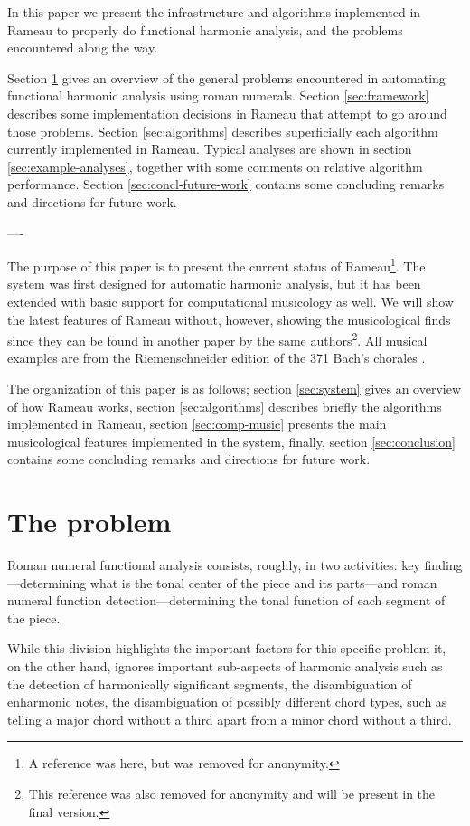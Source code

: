 In this paper we present the infrastructure and algorithms implemented
in Rameau to properly do functional harmonic analysis, and the
problems encountered along the way.

Section \ref{sec:problem} gives an overview of the general problems
encountered in automating functional harmonic analysis using roman
numerals. Section \ref{sec:framework} describes some implementation
decisions in Rameau that attempt to go around those problems. Section
\ref{sec:algorithms} describes superficially each algorithm currently
implemented in Rameau. Typical analyses are shown in section
\ref{sec:example-analyses}, together with some comments on relative
algorithm performance. Section \ref{sec:concl-future-work} contains
some concluding remarks and directions for future work.

----

The purpose of this paper is to present the current status of
Rameau\footnote{A reference was here, but was removed for
  anonymity.}. The system was first designed for automatic harmonic
analysis, but it has been extended with basic support for
computational musicology as well. We will show the latest features of
Rameau without, however, showing the musicological finds since they
can be found in another paper by the same authors\footnote{This
  reference was also removed for anonymity and will be present in the
  final version.}. All musical examples are from the Riemenschneider
edition of the 371 Bach's chorales \cite{bach41:371}.

The organization of this paper is as follows; section \ref{sec:system}
gives an overview of how Rameau works, section \ref{sec:algorithms}
describes briefly the algorithms implemented in Rameau, section
\ref{sec:comp-music} presents the main musicological features
implemented in the system, finally, section \ref{sec:conclusion}
contains some concluding remarks and directions for future work.


\section{The problem}
\label{sec:problem}

Roman numeral functional analysis consists, roughly, in two
activities: key finding---determining what is the tonal center of the
piece and its parts---and roman numeral function
detection---determining the tonal function of each segment of the piece. 

While this division highlights the important factors for this specific
problem it, on the other hand, ignores important sub-aspects of
harmonic analysis such as the detection of harmonically significant
segments, the disambiguation of enharmonic notes, the disambiguation
of possibly different chord types, such as telling a major chord
without a third apart from a minor chord without a third.


